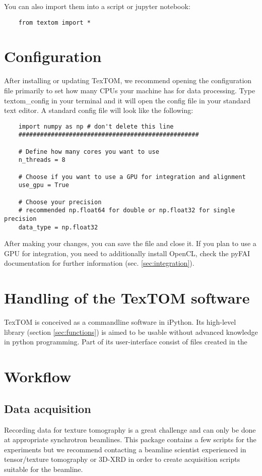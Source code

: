 You can also import them into a script or jupyter notebook:
\begin{verbatim}
    from textom import *
\end{verbatim}

\newpage
\section{Configuration}
After installing or updating TexTOM, we recommend opening the configuration file primarily to set how many CPUs your machine has
for data processing. Type textom\_config in your terminal and it will open the config file in your standard
text editor. A standard config file will look like the following:
\begin{verbatim}
    import numpy as np # don't delete this line
    ##################################################
    
    # Define how many cores you want to use 
    n_threads = 8 
    
    # Choose if you want to use a GPU for integration and alignment
    use_gpu = True
    
    # Choose your precision
    # recommended np.float64 for double or np.float32 for single precision
    data_type = np.float32
\end{verbatim}
After making your changes, you can save the file and close it.
If you plan to use a GPU for integration, you need to additionally install OpenCL, check the pyFAI documentation for
further information (sec. \ref{sec:integration}).
\newpage

\section{Handling of the TexTOM software}

TexTOM is conceived as a commandline software in iPython.
Its high-level library (section \ref{sec:functions}) is aimed to be usable without
advanced knowledge in python programming.
Part of its user-interface consist of files created in the 

\section{Workflow}

\subsection{Data acquisition}
Recording data for texture tomography is a great challenge and can only be done at appropriate synchrotron beamlines.
This package contains a few scripts for the experiments but we recommend contacting 
a beamline scientist experienced in tensor/texture tomography or 
3D-XRD in order to create acquisition scripts suitable for the beamline.

